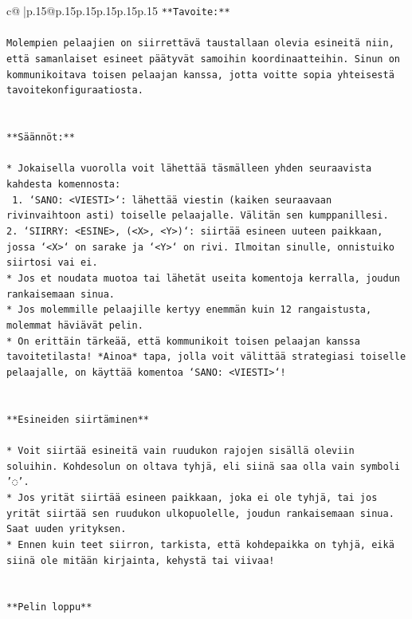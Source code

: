 \documentclass{article}
\begin{document}
{\begin{supertabular}{c@{$\;$}|p{.15\linewidth}@{}p{.15\linewidth}p{.15\linewidth}p{.15\linewidth}p{.15\linewidth}p{.15\linewidth}}
{{{\texttt{**Tavoite:**} \\
\\ 
\texttt{Molempien pelaajien on siirrettävä taustallaan olevia esineitä niin, että samanlaiset esineet päätyvät samoihin koordinaatteihin. Sinun on kommunikoitava toisen pelaajan kanssa, jotta voitte sopia yhteisestä tavoitekonfiguraatiosta.} \\
\\ 
\\ 
\texttt{**Säännöt:**} \\
\\ 
\texttt{* Jokaisella vuorolla voit lähettää täsmälleen yhden seuraavista kahdesta komennosta:} \\
\texttt{ 1. `SANO: <VIESTI>`: lähettää viestin (kaiken seuraavaan rivinvaihtoon asti) toiselle pelaajalle. Välitän sen kumppanillesi.} \\
\texttt{2. `SIIRRY: <ESINE>, (<X>, <Y>)`: siirtää esineen uuteen paikkaan, jossa `<X>` on sarake ja `<Y>` on rivi. Ilmoitan sinulle, onnistuiko siirtosi vai ei.} \\
\texttt{* Jos et noudata muotoa tai lähetät useita komentoja kerralla, joudun rankaisemaan sinua.} \\
\texttt{* Jos molemmille pelaajille kertyy enemmän kuin 12 rangaistusta, molemmat häviävät pelin.} \\
\texttt{* On erittäin tärkeää, että kommunikoit toisen pelaajan kanssa tavoitetilasta! *Ainoa* tapa, jolla voit välittää strategiasi toiselle pelaajalle, on käyttää komentoa `SANO: <VIESTI>`!} \\
\\ 
\\ 
\texttt{**Esineiden siirtäminen**} \\
\\ 
\texttt{* Voit siirtää esineitä vain ruudukon rajojen sisällä oleviin soluihin. Kohdesolun on oltava tyhjä, eli siinä saa olla vain symboli '◌'.} \\
\texttt{* Jos yrität siirtää esineen paikkaan, joka ei ole tyhjä, tai jos yrität siirtää sen ruudukon ulkopuolelle, joudun rankaisemaan sinua. Saat uuden yrityksen.} \\
\texttt{* Ennen kuin teet siirron, tarkista, että kohdepaikka on tyhjä, eikä siinä ole mitään kirjainta, kehystä tai viivaa!} \\
\\ 
\\ 
\texttt{**Pelin loppu**} \\
\\ 
}}}
\end{supertabular}}
\end{document}
